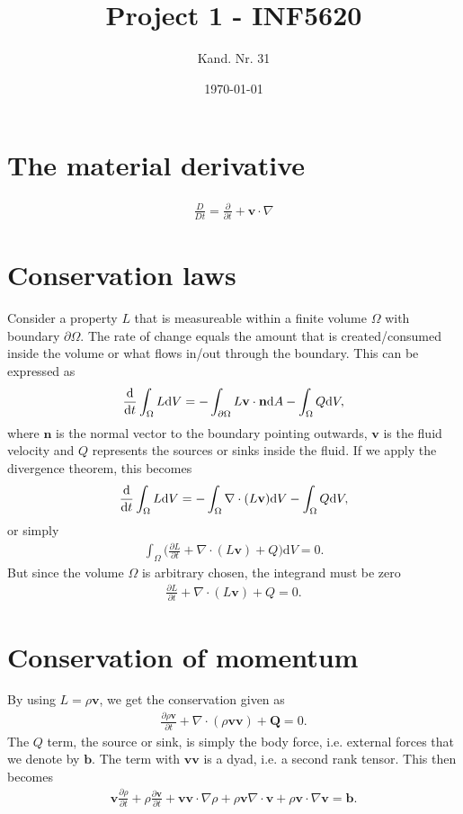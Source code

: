 \documentclass[a4paper,10pt]{article}
\title{Project 1 - INF5620}
\date{\today}
\author{Kand. Nr. 31}
\renewcommand{\vec}[1]{\mathbf{#1}}
\renewcommand{\(}{\left(}
\renewcommand{\)}{\right)}
\newcommand{\dm}[1]{\text{d}#1}
\newcommand{\dpart}[2]{\frac{\partial#1}{\partial#2}}
\begin{document}
\section*{The material derivative}
\begin{align*}
  \frac{D}{Dt} = \dpart{}{t} + \vec v \cdot \nabla
\end{align*}
\section*{Conservation laws}
Consider a property $L$ that is measureable within a finite volume $\Omega$ with boundary $\partial \Omega$. The rate of change equals the amount that is created/consumed inside the volume or what flows in/out through the boundary. This can be expressed as
\begin{align*}
  \frac{\dm }{\dm t} \int_\Omega L \dm V = -\int_{\partial \Omega} L\vec v \cdot \vec n \dm A - \int_\Omega Q \dm V,
\end{align*}
where $\vec n$ is the normal vector to the boundary pointing outwards, $\vec v$ is the fluid velocity and $Q$ represents the sources or sinks inside the fluid. If we apply the divergence theorem, this becomes
\begin{align*}
  \frac{\dm }{\dm t} \int_\Omega L \dm V = -\int_{\Omega} \nabla \cdot (L\vec v) \dm V - \int_\Omega Q \dm V,
\end{align*}
or simply
\begin{align*}
\int_\Omega \Bigg(\dpart{L}{t} + \nabla \cdot (L\vec v) + Q \Bigg)\dm V = 0.
\end{align*}
But since the volume $\Omega$ is arbitrary chosen, the integrand must be zero
\begin{align*}
  \dpart{L}{t} + \nabla \cdot (L\vec v) + Q = 0.
\end{align*}
\section*{Conservation of momentum}
By using $L=\rho \vec v$, we get the conservation given as
\begin{align*}
  \dpart{\rho\vec v}{t} + \nabla \cdot (\rho\vec v\vec v) + \vec Q = 0.
\end{align*}
The $Q$ term, the source or sink, is simply the body force, i.e. external forces that we denote by $\vec b$. The term with $\vec v\vec v$ is a dyad, i.e. a second rank tensor. This then becomes
\begin{align*}
  \vec v\dpart{\rho}{t} + \rho\dpart{\vec v}{t} + \vec v\vec v\cdot\nabla \rho + \rho\vec v\nabla\cdot \vec v + \rho\vec v\cdot \nabla \vec v = \vec b.
\end{align*}
\end{document}
